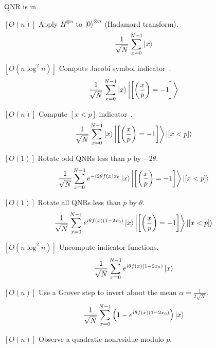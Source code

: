 \documentclass[final]{beamer}
\newlength{\colwidth}
\begin{document}
\begin{frame}[t]
\begin{columns}[t]
\begin{column}{\colwidth}
\begin{exampleblock}{QNR is in \EQPC}
\begin{algorithm}
  \caption{
    Given $p\equiv 1 \bmod 8$, 
  choose the smallest $n$ such that $p<2^n=N$. 
    Let $\theta=\mbox{arccos}\left(1-\frac{2^n}{p-1}\right)$, and
    $f(x)=\left[\jacobi{x}{p}=-1\text{ and } 0\le x<p\right]$.
}
  \begin{noindqlist}
  \item $[O(n)]$ Apply $H^{\otimes n}$ to \( \left| 0 \right\rangle^{\otimes n} \) (Hadamard transform).
    \[ \frac{1}{\sqrt{N}}\sum_{x=0}^{N-1} \left| x \right\rangle \]
  \item $[O(n\log^2 n)]$ Compute Jacobi symbol indicator~\cite{harvey:hal-02070778,DBLP:journals/corr/abs-1004-2091}.
\[\frac{1}{\sqrt{N}} \sum_{x=0}^{N-1} \left| x \right\rangle\left| \left[\left( \displaystyle\frac{x}{p} \right)=-1\right] \right\rangle\]
\item $[O(n)]$ Compute $[x<p]$ indicator~\cite{comparator}.
\[\frac{1}{\sqrt{N}} \sum_{x=0}^{N-1} \left| x \right\rangle\left| \left[\left( \displaystyle\frac{x}{p} \right)=-1\right] \right\rangle\left| [x<p] \right\rangle\]
  \item $[O(1)]$ Rotate odd QNRs less than $p$ by $-2\theta$.
  \[\frac{1}{\sqrt{N}} \sum_{x=0}^{N-1} e^{-i2\theta f(x)x_0}\left| x \right\rangle\left| \left[\left( \displaystyle\frac{x}{p} \right)=-1\right] \right\rangle\left| [x<p] \right\rangle\]
\item $[O(1)]$ Rotate all QNRs less than $p$ by $\theta$.
  \[\frac{1}{\sqrt{N}} \sum_{x=0}^{N-1} e^{i\theta f(x)(1-2x_0)}\left| x \right\rangle\left| \left[\left( \displaystyle\frac{x}{p} \right)=-1\right] \right\rangle\left| [x<p] \right\rangle\]
\item $[O(n\log^2 n)]$ Uncompute indicator functions.
  \[\frac{1}{\sqrt{N}} \sum_{x=0}^{N-1} e^{i\theta f(x)(1-2x_0)}\left| x \right\rangle\]
\item $[O(n)]$ Use a Grover step to invert about the mean $\alpha=\frac{1}{2\sqrt{N}}$.
    \[ \frac{1}{\sqrt N}\sum_{x=0}^{N-1} \left(1-e^{i\theta f(x) (1-2x_0)}\right)\left| x \right\rangle \]
  \item $[O(n)]$ Observe a quadratic nonresidue modulo $p$.
  \end{noindqlist}
\end{algorithm}


\end{exampleblock}
\end{column}
\end{columns}
\end{frame}
\end{document}
